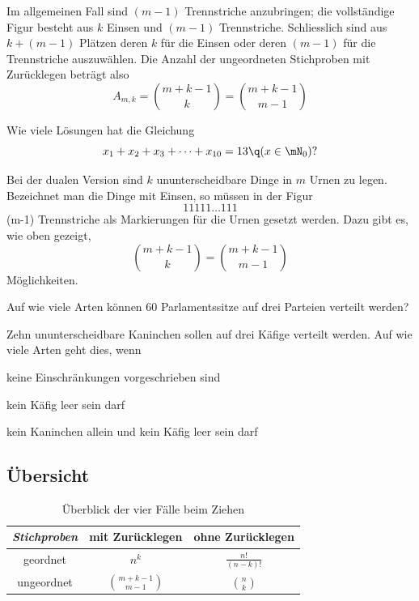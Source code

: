 \documentclass[%
11pt,%
twoside,%
titlepage,%
german,%
headsepline%
]{scrartcl}
\newcommand{\spaltenheight}{\rule{0mm}{3ex}}
\newcommand{\spaltensep}{\\[1ex]}
\begin{document}
Im allgemeinen Fall sind $(m-1)$ Trennstriche anzubringen; die vollständige Figur besteht aus $k$ Einsen und $(m-1)$ Trennstriche. Schliesslich sind aus $k+(m-1)$ Plätzen deren $k$ für die Einsen oder deren $(m-1)$ für die Trennstriche auszuwählen.
Die Anzahl der ungeordneten Stichproben mit Zurücklegen beträgt also
$$A_{m,k}=\binom{m+k-1}{k}=\binom{m+k-1}{m-1}$$

\begin{ueb}
Wie viele Lösungen hat die Gleichung
$$x_1+x_2+x_3+\dots+x_{10}=13\q (x\in\mN_0)?$$
\end{ueb}

Bei der dualen Version sind $k$ ununterscheidbare Dinge in $m$ Urnen zu legen. Bezeichnet man die Dinge mit Einsen, so müssen in der Figur
$$11111\dots111$$
(m-1) Trennstriche als Markierungen für die Urnen gesetzt werden. Dazu gibt es, wie oben gezeigt,
$$\binom{m+k-1}{k}=\binom{m+k-1}{m-1}$$
Möglichkeiten.

\begin{ueb}[Parlamentssitze]
Auf wie viele Arten können 60 Parlamentssitze auf drei Parteien verteilt werden?
\end{ueb}

\begin{ueb}[Kaninchen]
Zehn ununterscheidbare Kaninchen sollen auf drei Käfige verteilt werden. Auf wie viele Arten geht dies, wenn
\begin{enumeratea}
\item keine Einschränkungen vorgeschrieben sind
\item kein Käfig leer sein darf
\item kein Kaninchen allein und kein Käfig leer sein darf
\end{enumeratea}
\end{ueb}

\subsection{Übersicht}

\begin{table}[h]
\large
\centering
\begin{tabular}{|c|c|c|} \hline
\rowcolor{Gray}\spaltenheight \emph{Stichproben} & mit Zurücklegen & ohne Zurücklegen\spaltensep\hline
\rowcolor{lightyellow}\spaltenheight geordnet & $n^k$ & $\frac{n!}{(n-k)!}$\spaltensep \hline
\rowcolor{Gray}\spaltenheight ungeordnet & $\binom{m+k-1}{m-1}$ & $\binom{n}{k}$\spaltensep \hline
\end{tabular}
\caption{Überblick der vier Fälle beim Ziehen}
\end{table}
\end{document}
